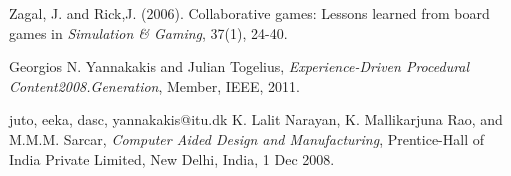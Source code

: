 \documentclass[a4paper,11pt]{article}
\begin{document}
\begin{thebibliography}{1}
Zagal, J. and Rick,J. (2006). Collaborative games: Lessons learned from board games in \textit{Simulation \& Gaming}, 37(1), 24-40.







Georgios N. Yannakakis and Julian Togelius, \emph{Experience-Driven Procedural Content2008.Generation}, Member, IEEE, 2011.

{juto, eeka, dasc, yannakakis}@itu.dk
K. Lalit Narayan, K. Mallikarjuna Rao, and M.M.M. Sarcar, \emph{Computer Aided Design and Manufacturing}, Prentice-Hall of India Private Limited, New Delhi, India, 1 Dec 2008.















\end{thebibliography}
\end{document}
